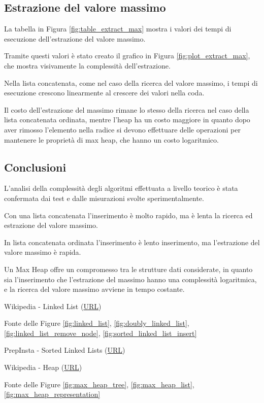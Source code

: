 \documentclass{article}
\begin{document}
\subsection{Estrazione del valore massimo}

La tabella in Figura \ref{fig:table_extract_max} mostra i valori dei tempi di esecuzione dell'estrazione del valore massimo.

Tramite questi valori è stato creato il grafico in Figura \ref{fig:plot_extract_max}, che mostra visivamente la complessità dell'estrazione.

\vspace{5pt}
Nella lista concatenata, come nel caso della ricerca del valore massimo, i tempi di esecuzione crescono linearmente al crescere dei valori nella coda.

\vspace{5pt}
Il costo dell'estrazione del massimo rimane lo stesso della ricerca nel caso della lista concatenata ordinata, mentre l'heap ha un costo maggiore in quanto dopo aver rimosso l'elemento nella radice si devono effettuare delle operazioni per mantenere le proprietà di max heap, che hanno un costo logaritmico.

\subsection{Conclusioni}

L'analisi della complessità degli algoritmi effettuata a livello teorico è stata confermata dai test e dalle misurazioni svolte sperimentalmente.

\vspace{5pt}
Con una lista concatenata l'inserimento è molto rapido, ma è lenta la ricerca ed estrazione del valore massimo.

\vspace{5pt}
In lista concatenata ordinata l'inserimento è lento inserimento, ma l'estrazione del valore massimo è rapida.

\vspace{5pt}
Un Max Heap offre un compromesso tra le strutture dati considerate, in quanto sia l'inserimento che l'estrazione del massimo hanno una complessità logaritmica, e la ricerca del valore massimo avviene in tempo costante.

\clearpage
\begin{thebibliography}{9}
    Wikipedia - Linked List (\href{https://en.wikipedia.org/wiki/Linked_list}{URL})
    \par
    Fonte delle Figure \ref{fig:linked_list}, \ref{fig:doubly_linked_list}, \ref{fig:linked_list_remove_node}, \ref{fig:sorted_linked_list_insert}

    PrepInsta - Sorted Linked Lists (\href{https://prepinsta.com/c-program/to-insert-an-element-in-a-sorted-linked-list/}{URL})

    Wikipedia - Heap (\href{https://en.wikipedia.org/wiki/Heap_(data_structure)}{URL})
    \par Fonte delle Figure \ref{fig:max_heap_tree}, \ref{fig:max_heap_list}, \ref{fig:max_heap_representation}
\end{thebibliography}
\end{document}
